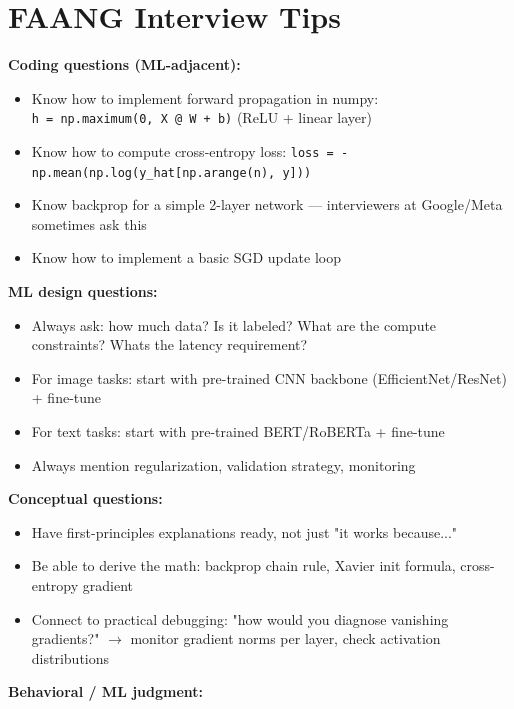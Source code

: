 \documentclass[11pt]{article}
\providecommand{\tightlist}{\setlength{\itemsep}{1pt}\setlength{\parskip}{0pt}}
\begin{document}
\section{FAANG Interview Tips}\label{faang-interview-tips}

\textbf{Coding questions (ML-adjacent):}

\begin{itemize}
\tightlist
\item
  Know how to implement forward propagation in numpy: \texttt{h\ =\ np.maximum(0,\ X\ @\ W\ +\ b)} (ReLU + linear layer)
\item
  Know how to compute cross-entropy loss: \texttt{loss\ =\ -np.mean(np.log(y\_hat{[}np.arange(n),\ y{]}))}
\item
  Know backprop for a simple 2-layer network --- interviewers at Google/Meta sometimes ask this
\item
  Know how to implement a basic SGD update loop
\end{itemize}

\textbf{ML design questions:}

\begin{itemize}
\tightlist
\item
  Always ask: how much data? Is it labeled? What are the compute constraints? What\textquotesingle s the latency requirement?
\item
  For image tasks: start with pre-trained CNN backbone (EfficientNet/ResNet) + fine-tune
\item
  For text tasks: start with pre-trained BERT/RoBERTa + fine-tune
\item
  Always mention regularization, validation strategy, monitoring
\end{itemize}

\textbf{Conceptual questions:}

\begin{itemize}
\tightlist
\item
  Have first-principles explanations ready, not just "it works because..."
\item
  Be able to derive the math: backprop chain rule, Xavier init formula, cross-entropy gradient
\item
  Connect to practical debugging: "how would you diagnose vanishing gradients?" \(\rightarrow\) monitor gradient norms per layer, check activation distributions
\end{itemize}

\textbf{Behavioral / ML judgment:}
\end{document}
